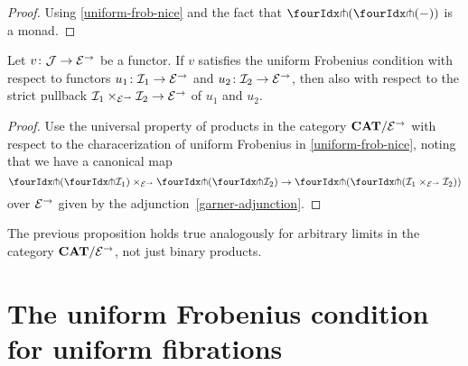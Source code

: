 \documentclass[reqno,10pt,a4paper,oneside,draft]{amsart}
\begin{document}
\begin{proof}
Using \cref{uniform-frob-nice} and the fact that $\liftl{(\liftr{(-)})}$ is a monad.
\end{proof}

\begin{proposition} \label{uniform-frobenius-product-u}
Let $v \co \cal{J} \to \cal{E}^\to$ be a functor.
If $v$ satisfies the uniform Frobenius condition with respect to functors $u_1 \co \cal{I}_1 \to \cal{E}^\to$ and $u_2 \co \cal{I}_2 \to \cal{E}^\to$, then also with respect to the strict pullback $\cal{I}_1 \times_{\cal{E}^\to} \cal{I}_2 \to \cal{E}^\to$ of $u_1$ and $u_2$.
\end{proposition}

\begin{proof}
Use the universal property of products in the category $\CAT/\cal{E}^\to$ with respect to the characerization of uniform Frobenius in \cref{uniform-frob-nice}, noting that we have a canonical map
\[
\liftl{(\liftr{\cal{I}_1})} \times_{\cal{E}^\to} \liftl{(\liftr{\cal{I}_2})} \to \liftl{(\liftr{(\cal{I}_1 \times_{\cal{E}^\to} \cal{I}_2)})}
\]
over $\cal{E}^\to$ given by the adjunction~\eqref{garner-adjunction}.
\end{proof}

\begin{remark} \label{uniform-frobenius-limit-u}
The previous proposition holds true analogously for arbitrary limits in the category $\CAT/\cal{E}^\to$, not just binary products.
\end{remark}


\section{The uniform Frobenius condition for uniform fibrations}
\label{sec:frocuf}
\end{document}
